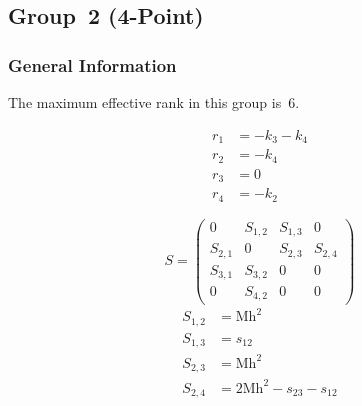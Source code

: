 \documentclass[a4paper]{article}
\begin{document}

\subsection{Group~2 (4-Point)}
\subsubsection*{General Information}
The maximum effective rank in this group is~6.

\begin{subequations}
\begin{align}
r_{1} &= -k_{3}-k_{4}\\
r_{2} &= -k_{4}\\
r_{3} &= 0\\
r_{4} &= -k_{2}
\end{align}
\end{subequations}

\begin{equation}
S=\left(\begin{array}{cccc}
   0&
   S_{1,2}&
   S_{1,3}&
   0\\
   S_{2,1}&
   0&
   S_{2,3}&
   S_{2,4}\\
   S_{3,1}&
   S_{3,2}&
   0&
   0\\
   0&
   S_{4,2}&
   0&
   0\end{array}\right)
\end{equation}
\begin{subequations}
\begin{align}
   S_{1,2}&=\text{Mh}^2\\
   S_{1,3}&=s_{12}\\
   S_{2,3}&=\text{Mh}^2\\
   S_{2,4}&=2\text{Mh}^2-s_{23}-s_{12}
\end{align}
\end{subequations}
\end{document}
